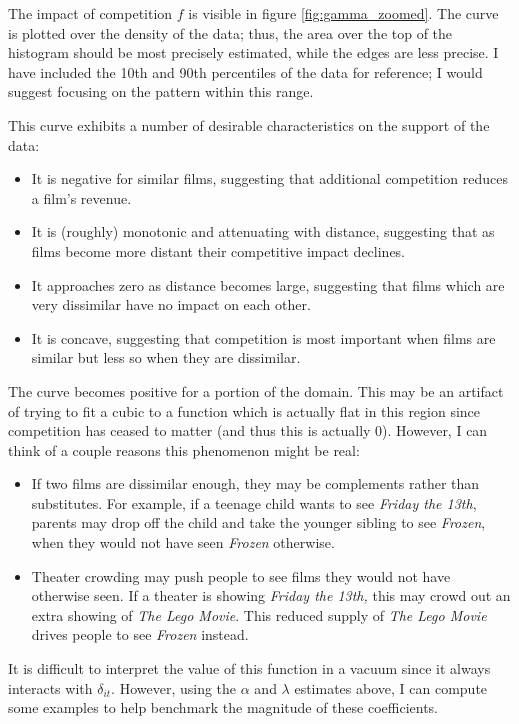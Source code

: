 \documentclass{article}
\begin{document}
The impact of competition $f$ is visible in figure \ref{fig:gamma_zoomed}. The curve is plotted over the density of the data; thus, the area over the top of the histogram should be most precisely estimated, while the edges are less precise. I have included the 10th and 90th percentiles of the data for reference; I would suggest focusing on the pattern within this range.

This curve exhibits a number of desirable characteristics on the support of the data:
\begin{itemize}
    \item It is negative for similar films, suggesting that additional competition reduces a film's revenue.
    \item It is (roughly) monotonic and attenuating with distance, suggesting that as films become more distant their competitive impact declines.
    \item It approaches zero as distance becomes large, suggesting that films which are very dissimilar have no impact on each other.
    \item It is concave, suggesting that competition is most important when films are similar but less so when they are dissimilar.
\end{itemize}

The curve becomes positive for a portion of the domain. This may be an artifact of trying to fit a cubic to a function which is actually flat in this region since competition has ceased to matter (and thus this is actually 0). However, I can think of a couple reasons this phenomenon might be real:
\begin{itemize}
    \item If two films are dissimilar enough, they may be complements rather than substitutes. For example, if a teenage child wants to see \emph{Friday the 13th}, parents may drop off the child and take the younger sibling to see \emph{Frozen}, when they would not have seen \emph{Frozen} otherwise.
    \item Theater crowding may push people to see films they would not have otherwise seen. If a theater is showing \emph{Friday the 13th,} this may crowd out an extra showing of \emph{The Lego Movie}. This reduced supply of \emph{The Lego Movie} drives people to see \emph{Frozen} instead.
\end{itemize}

It is difficult to interpret the value of this function in a vacuum since it always interacts with $\delta_{it}$. However, using the $\alpha$ and $\lambda$ estimates above, I can compute some examples to help benchmark the magnitude of these coefficients.
\end{document}

